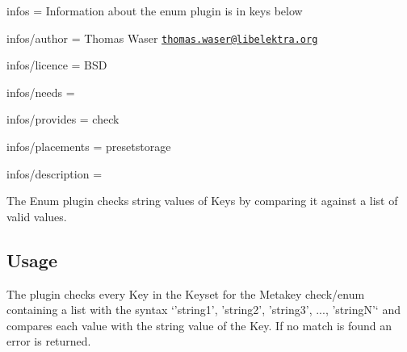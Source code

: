 
\begin{DoxyItemize}
\item infos = Information about the enum plugin is in keys below
\item infos/author = Thomas Waser \href{mailto:thomas.waser@libelektra.org}{\tt thomas.\+waser@libelektra.\+org}
\item infos/licence = B\+S\+D
\item infos/needs =
\item infos/provides = check
\item infos/placements = presetstorage
\item infos/description =
\end{DoxyItemize}

The Enum plugin checks string values of Keys by comparing it against a list of valid values.

\subsection*{Usage}

The plugin checks every Key in the Keyset for the Metakey {\ttfamily check/enum} containing a list with the syntax `'string1', 'string2', 'string3', ..., 'string\+N'` and compares each value with the string value of the Key. If no match is found an error is returned. 